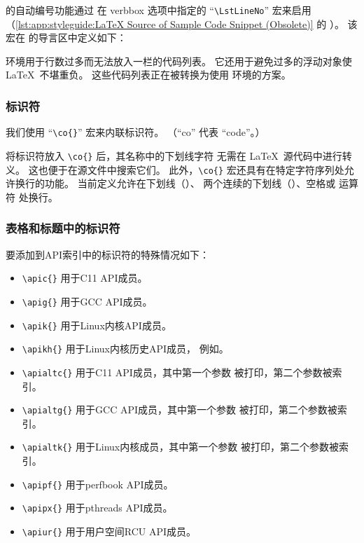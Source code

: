 

 的自动编号功能通过
在 verbbox 选项中指定的 ``\verb|\LstLineNo|'' 宏来启用
（\cref{lst:app:styleguide:LaTeX Source of Sample Code Snippet (Obsolete)} 的
）。
该宏在  的导言区中定义如下：

\begin{VerbatimU}
\newcommand{\LstLineNo}
  {\makebox[5ex][r]{\arabic{VerbboxLineNo}\hspace{2ex}}}
\end{VerbatimU}

 环境用于行数过多而无法放入一栏的代码列表。
它还用于避免过多的浮动对象使\LaTeX\ 不堪重负。
这些代码列表正在被转换为使用  环境的方案。

\subsubsection{标识符}
\label{sec:app:styleguide:Identifier}

我们使用 ``\verb|\co{}|'' 宏来内联标识符。
（``co'' 代表 ``code''。）

将标识符放入 \verb|\co{}| 后，其名称中的下划线字符
无需在 \LaTeX\ 源代码中进行转义。
这也便于在源文件中搜索它们。
此外，\verb|\co{}| 宏还具有在特定字符序列处允许换行的功能。
当前定义允许在下划线（\tco{_}）、
两个连续的下划线（\tco{__}）、空格或
运算符 \tco{->} 处换行。

\subsubsection{表格和标题中的标识符}
\label{sec:app:styleguide:Identifier inside Table and Heading}
要添加到API索引中的标识符的特殊情况如下：

\begin{itemize}
	\item	\verb|\apic{}| 用于C11 API成员。
	\item	\verb|\apig{}| 用于GCC API成员。
	\item	\verb|\apik{}| 用于Linux内核API成员。
	\item	\verb|\apikh{}| 用于Linux内核历史API成员，
  		例如。
	\item	\verb|\apialtc{}| 用于C11 API成员，其中第一个参数
  		被打印，第二个参数被索引。
	\item	\verb|\apialtg{}| 用于GCC API成员，其中第一个参数
  		被打印，第二个参数被索引。
	\item	\verb|\apialtk{}| 用于Linux内核成员，其中第一个参数
  		被打印，第二个参数被索引。
	\item	\verb|\apipf{}| 用于perfbook API成员。
	\item	\verb|\apipx{}| 用于pthreads API成员。
	\item	\verb|\apiur{}| 用于用户空间RCU API成员。
\end{itemize}


